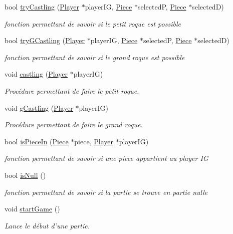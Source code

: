 \begin{DoxyCompactItemize}
bool \hyperlink{class_chess_a750a533ab68f71194b7f1ea7a0b5cdda}{try\-Castling} (\hyperlink{class_player}{Player} $\ast$player\-I\-G, \hyperlink{class_piece}{Piece} $\ast$selected\-P, \hyperlink{class_piece}{Piece} $\ast$selected\-D)
\begin{DoxyCompactList}\small\item\em fonction permettant de savoir si le petit roque est possible \end{DoxyCompactList}\item 
bool \hyperlink{class_chess_a63ef59d4f464e63ae2da3386c1abcea3}{try\-G\-Castling} (\hyperlink{class_player}{Player} $\ast$player\-I\-G, \hyperlink{class_piece}{Piece} $\ast$selected\-P, \hyperlink{class_piece}{Piece} $\ast$selected\-D)
\begin{DoxyCompactList}\small\item\em fonction permettant de savoir si le grand roque est possible \end{DoxyCompactList}\item 
void \hyperlink{class_chess_af1af4be28978dcf09309883d38cf71cd}{castling} (\hyperlink{class_player}{Player} $\ast$player\-I\-G)
\begin{DoxyCompactList}\small\item\em Procédure permettant de faire le petit roque. \end{DoxyCompactList}\item 
void \hyperlink{class_chess_a81042bba80e10e971474b6f8488d8242}{g\-Castling} (\hyperlink{class_player}{Player} $\ast$player\-I\-G)
\begin{DoxyCompactList}\small\item\em Procédure permettant de faire le grand roque. \end{DoxyCompactList}\item 
bool \hyperlink{class_chess_a003d9681123559dc1c1b665695e6cd20}{is\-Piece\-In} (\hyperlink{class_piece}{Piece} $\ast$piece, \hyperlink{class_player}{Player} $\ast$player\-I\-G)
\begin{DoxyCompactList}\small\item\em fonction permettant de savoir si une piece appartient au player I\-G \end{DoxyCompactList}\item 
bool \hyperlink{class_chess_a97adeb237c2acae0efe4097a36a304b9}{is\-Null} ()
\begin{DoxyCompactList}\small\item\em fonction permettant de savoir si la partie se trouve en partie nulle \end{DoxyCompactList}\item 
void \hyperlink{class_chess_aea92734ff5516066d5c1a690a78ea146}{start\-Game} ()
\begin{DoxyCompactList}\small\item\em Lance le début d'une partie. \end{DoxyCompactList}\end{DoxyCompactItemize}



